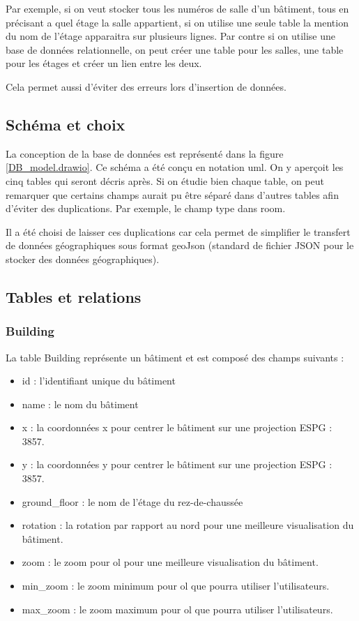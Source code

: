 \documentclass[
    iai, %
    il, %
]{heig-tb}
\begin{document}
Par exemple, si on veut stocker tous les numéros de salle d'un bâtiment, tous en précisant a quel étage la salle appartient,
si on utilise une seule table la mention du nom de l'étage apparaitra sur plusieurs lignes.
Par contre si on utilise une base de données relationnelle, on peut créer une table pour les salles,
une table pour les étages et créer un lien entre les deux.

Cela permet aussi d'éviter des erreurs lors d'insertion de données.

\subsection{Schéma et choix}


La conception de la base de données est représenté dans la figure \ref{DB_model.drawio}.
Ce schéma a été conçu en notation \gls{uml}. On y aperçoit les cinq tables qui seront décris après.
Si on étudie bien chaque table, on peut remarquer que certains champs aurait pu être séparé dans d'autres tables afin d'éviter des duplications. 
Par exemple, le champ type dans room.

Il a été choisi de laisser ces duplications
car cela permet de simplifier le transfert de données géographiques sous format geoJson
(standard de fichier JSON pour le stocker des données géographiques).

\subsection{Tables et  relations}
\subsubsection{Building}
La table Building représente un bâtiment et est composé des champs suivants :

\begin{itemize}
    \item id : l'identifiant unique du bâtiment
    \item name : le nom du bâtiment
    \item x : la coordonnées x pour centrer le bâtiment sur une projection ESPG : 3857.
    \item y : la coordonnées y pour centrer le bâtiment sur une projection ESPG : 3857.
    \item ground\_floor : le nom de l'étage du rez-de-chaussée
    \item rotation : la rotation par rapport au nord pour une meilleure visualisation du bâtiment.
    \item zoom : le zoom pour \gls{ol} pour une meilleure visualisation du bâtiment.
    \item min\_zoom : le zoom minimum pour \gls{ol} que pourra utiliser l'utilisateurs.
    \item max\_zoom : le zoom maximum pour \gls{ol} que pourra utiliser l'utilisateurs.
\end{itemize}
\end{document}
